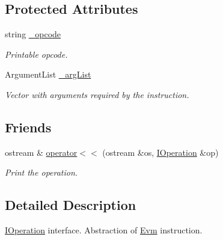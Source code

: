 \subsection*{Protected Attributes}
\begin{DoxyCompactItemize}
\item 
\mbox{\label{struct_evm_1_1_operation_1_1_i_operation_a41039f84360a1ec0d86cf2eb92bafe97}} 
string \mbox{\hyperlink{struct_evm_1_1_operation_1_1_i_operation_a41039f84360a1ec0d86cf2eb92bafe97}{\+\_\+opcode}}
\begin{DoxyCompactList}\small\item\em Printable opcode. \end{DoxyCompactList}\item 
\mbox{\label{struct_evm_1_1_operation_1_1_i_operation_af12706aa091dddcd3f17e10797a232d7}} 
Argument\+List \mbox{\hyperlink{struct_evm_1_1_operation_1_1_i_operation_af12706aa091dddcd3f17e10797a232d7}{\+\_\+arg\+List}}
\begin{DoxyCompactList}\small\item\em Vector with arguments required by the instruction. \end{DoxyCompactList}\end{DoxyCompactItemize}
\subsection*{Friends}
\begin{DoxyCompactItemize}
\item 
ostream \& \mbox{\hyperlink{struct_evm_1_1_operation_1_1_i_operation_afed6ad5f16d9e581357397e96da68dae}{operator$<$$<$}} (ostream \&os, \mbox{\hyperlink{struct_evm_1_1_operation_1_1_i_operation}{I\+Operation}} \&op)
\begin{DoxyCompactList}\small\item\em Print the operation. \end{DoxyCompactList}\end{DoxyCompactItemize}


\subsection{Detailed Description}
\mbox{\hyperlink{struct_evm_1_1_operation_1_1_i_operation}{I\+Operation}} interface. Abstraction of \mbox{\hyperlink{namespace_evm}{Evm}} instruction. 

